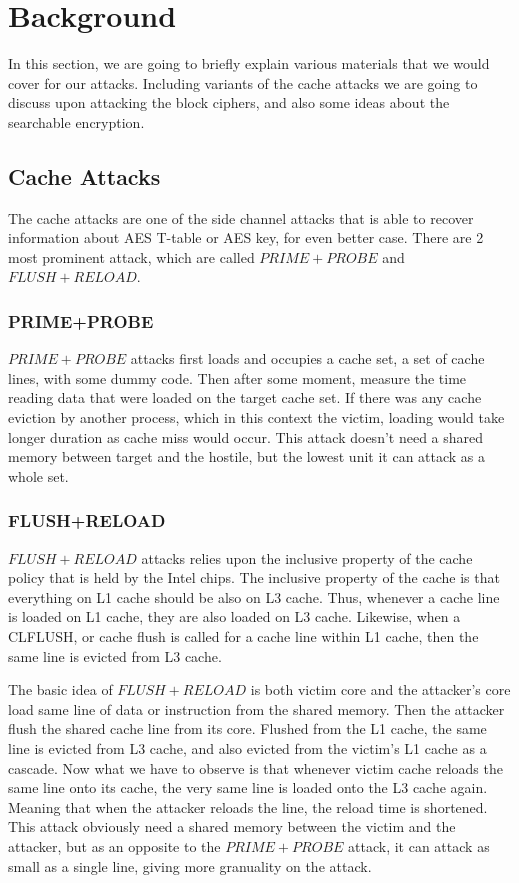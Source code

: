 \documentclass[a4paper]{article}
\begin{document}
\section{Background}

In this section, we are going to briefly explain various materials that we would cover for our attacks. Including variants of the cache attacks we are going to discuss upon attacking the block ciphers, and also some ideas about the searchable encryption.

\subsection{Cache Attacks}

The cache attacks are one of the side channel attacks that is able to recover information about AES T-table or AES key, for even better case. There are 2 most prominent attack, which are called $PRIME+PROBE$ and $FLUSH+RELOAD$.

\subsubsection{PRIME+PROBE}

$PRIME+PROBE$ attacks \cite{osvik2006cache} first loads and occupies a cache set, a set of cache lines, with some dummy code. Then after some moment, measure the time reading data that were loaded on the target cache set. If there was any cache eviction by another process, which in this context the victim, loading would take longer duration as cache miss would occur. This attack doesn't need a shared memory between target and the hostile, but the lowest unit it can attack as a whole set.

\subsubsection{FLUSH+RELOAD}

$FLUSH+RELOAD$ \cite{yarom2014flush+} attacks relies upon the inclusive property of the cache policy that is held by the Intel chips. The inclusive property of the cache is that everything on L1 cache should be also on L3 cache. Thus, whenever a cache line is loaded on L1 cache, they are also loaded on L3 cache. Likewise, when a CLFLUSH, or cache flush is called for a cache line within L1 cache, then the same line is evicted from L3 cache.\par
The basic idea of $FLUSH+RELOAD$ is both victim core and the attacker's core load same line of data or instruction from the shared memory. Then the attacker flush the shared cache line from its core. Flushed from the L1 cache, the same line is evicted from L3 cache, and also evicted from the victim's L1 cache as a cascade. Now what we have to observe is that whenever victim cache reloads the same line onto its cache, the very same line is loaded onto the L3 cache again. Meaning that when the attacker reloads the line, the reload time is shortened. This attack obviously need a shared memory between the victim and the attacker, but as an opposite to the $PRIME+PROBE$ attack, it can attack as small as a single line, giving more granuality on the attack.
\end{document}
